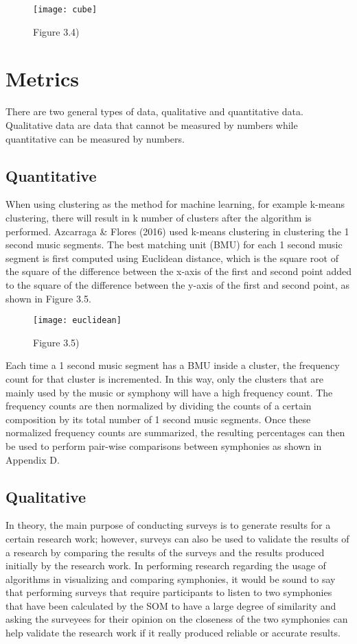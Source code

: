 \begin{figure}[h]
\caption{Figure 3.4)}
\centering
\texttt{[image: cube]}
\end{figure}

\section{Metrics}

There are two general types of data, qualitative and quantitative data. Qualitative data are data that cannot be measured by numbers while quantitative can be measured by numbers.

\subsection{Quantitative}

When using clustering as the method for machine learning, for example k-means clustering, there will result in k number of clusters after the algorithm is performed. Azcarraga \& Flores (2016) used k-means clustering in clustering the 1 second music segments. The best matching unit (BMU) for each 1 second music segment is first computed using Euclidean distance, which is the square root of the square of the difference between the x-axis of the first and second point added to the square of the difference between the y-axis of the first and second point, as shown in Figure 3.5.

\begin{figure}[h]
\caption{Figure 3.5)}
\centering
\texttt{[image: euclidean]}
\end{figure}

Each time a 1 second music segment has a BMU inside a cluster, the frequency count for that cluster is incremented. In this way, only the clusters that are mainly used by the music or symphony will have a high frequency count. The frequency counts are then normalized by dividing the counts of a certain composition by its total number of 1 second music segments. Once these normalized frequency counts are summarized, the resulting percentages can then be used to perform pair-wise comparisons between symphonies as shown in Appendix D.

\subsection{Qualitative}

In theory, the main purpose of conducting surveys is to generate results for a certain research work; however, surveys can also be used to validate the results of a research by comparing the results of the surveys and the results produced initially by the research work. In performing research regarding the usage of algorithms in visualizing and comparing symphonies, it would be sound to say that performing surveys that require participants to listen to two symphonies that have been calculated by the SOM to have a large degree of similarity and asking the surveyees for their opinion on the closeness of the two symphonies can help validate the research work if it really produced reliable or accurate results.

